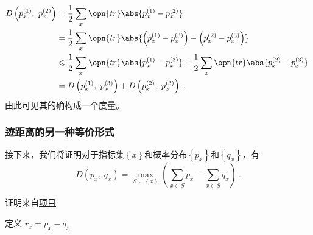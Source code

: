 \begin{equation}
\begin{aligned}
D\left(p_x^{(1)},~p_x^{(2)}\right) &= \frac{1}{2}\sum_x\opn{tr}\abs{p_x^{(1)} - p_x^{(2)}} \\
&= \frac{1}{2}\sum_x\opn{tr}\abs{\left(p_x^{(1)} - p_x^{(3)}\right) - \left(p_x^{(2)} - p_x^{(3)}\right)} \\
&\leqslant\frac{1}{2}\sum_x\opn{tr}\abs{p_x^{(1)} - p_x^{(3)}} + \frac{1}{2}\sum_x\opn{tr}\abs{p_x^{(2)} - p_x^{(3)}} \\
&=D\left(p_x^{(1)},~p_x^{(3)}\right)+D\left(p_x^{(2)},~p_x^{(3)}\right)~,
\end{aligned}~
\end{equation}
由此可见其的确构成一个度量。

\subsubsection{迹距离的另一种等价形式}

接下来，我们将证明对于指标集$\left\{x\right\}$和概率分布$\left\{p_x\right\}$和$\left\{q_x\right\}$，有
\begin{equation}
D\left(p_x,~q_x\right) = \max_{S \subseteq \left\{x\right\}}\left(\sum_{x\in S}p_x - \sum_{x\in S}q_x\right)~.
\end{equation}

证明来自\href{https://github.com/goropikari/SolutionQCQINielsenChuang}{项目}

定义 $r_x = p_x - q_x$




